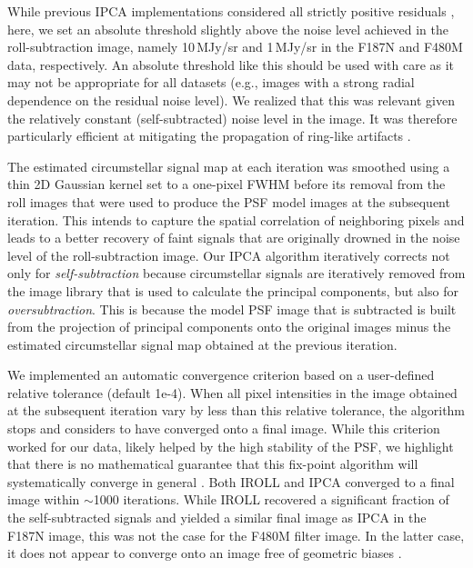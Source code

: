 \documentclass[longauth]{aa}
\begin{document}
\begin{appendix}
While previous IPCA implementations considered all strictly positive residuals \citep[e.g.,][]{Pairet2021, Juillard2023}, here, we set an absolute threshold slightly above the noise level achieved in the roll-subtraction image, namely 10\,MJy/sr and 1\,MJy/sr in the F187N and F480M data, respectively. An absolute threshold like this should be used with care as it may not be appropriate for all datasets (e.g., images with a strong radial dependence on the residual noise level). We realized that this was relevant given the relatively constant (self-subtracted) noise level in the image. It was therefore particularly efficient at mitigating the propagation of ring-like artifacts \citep[observed in][]{Pairet2021, Juillard2023}.

The estimated circumstellar signal map at each iteration was smoothed using a thin 2D Gaussian kernel set to a one-pixel FWHM before its removal from the roll images that were used to produce the PSF model images at the subsequent iteration. This intends to capture the spatial correlation of neighboring pixels and leads to a better recovery of faint signals that are originally drowned in the noise level of the roll-subtraction image.
Our IPCA algorithm iteratively corrects not only for \textit{self-subtraction} because circumstellar signals are iteratively removed from the image library that is used to calculate the principal components, but also for \textit{oversubtraction}. This is because the model PSF image that is subtracted is built from the projection of principal components onto the original images minus the estimated circumstellar signal map obtained at the previous iteration.

    
We implemented an automatic convergence criterion based on a user-defined relative tolerance (default 1e-4). When all pixel intensities in the image obtained at the subsequent iteration vary by less than this relative tolerance, the algorithm stops and considers to have converged onto a final image.
While this criterion worked for our data, likely helped by the high stability of the PSF, %
we highlight that there is no mathematical guarantee that this fix-point algorithm will systematically converge in general \citep[see also][]{Juillard2023}.
Both IROLL and IPCA converged to a final image within $\sim$1000 iterations. While IROLL recovered a significant fraction of the self-subtracted signals and yielded a similar final image as IPCA in the F187N image, this was not the case for the F480M filter image. In the latter case, it does not appear to converge onto an image free of geometric biases \citep[see e.g.,][]{Juillard2022}.


\end{appendix}
\end{document}

